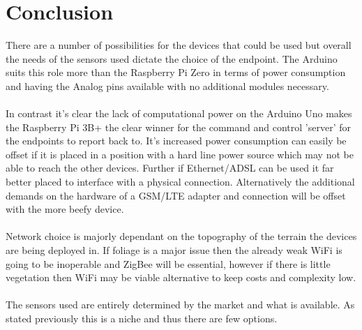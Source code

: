 \section{Conclusion}

There are a number of possibilities for the devices that could be used but overall the needs of the sensors used dictate the choice of the endpoint. The Arduino suits this role more than the Raspberry Pi Zero in terms of power consumption and having the Analog pins available with no additional modules necessary. 
\\\\
In contrast it's clear the lack of computational power on the Arduino Uno makes the Raspberry Pi 3B+ the clear winner for the command and control 'server' for the endpoints to report back to. It's increased power consumption can easily be offset if it is placed in a position with a hard line power source which may not be able to reach the other devices. Further if Ethernet/ADSL can be used it far better placed to interface with a physical connection. Alternatively the additional demands on the hardware of a GSM/LTE adapter and connection will be offset with the more beefy device. 
\\\\
Network choice is majorly dependant on the topography of the terrain the devices are being deployed in. If foliage is a major issue then the already weak WiFi is going to be inoperable and ZigBee will be essential, however if there is little vegetation then WiFi may be viable alternative to keep costs and complexity low.
\\\\
The sensors used are entirely determined by the market and what is available. As stated previously this is a niche and thus there are few options. 